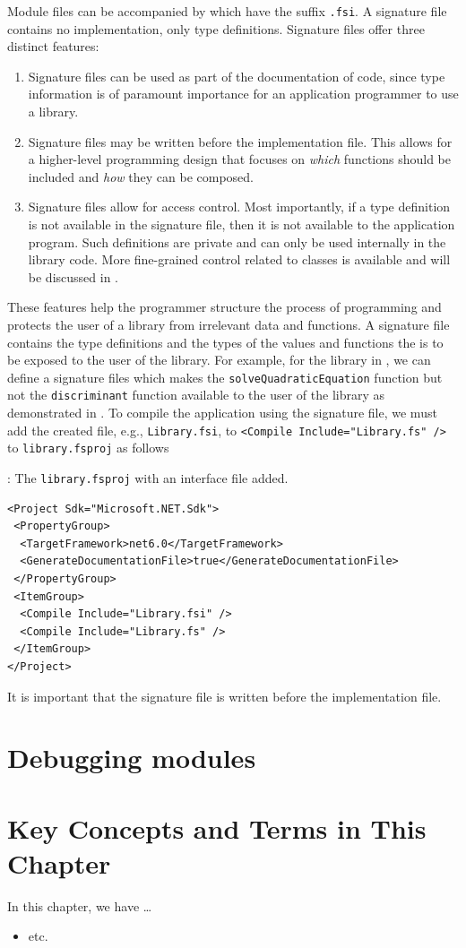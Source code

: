 \documentclass[fsharpNotes.tex]{subfiles}
\begin{document}
Module files can be accompanied by  which have the suffix \lstinline[language=console]{.fsi}. A signature file contains no implementation, only type definitions. Signature files offer three distinct features:
\begin{enumerate}
\item Signature files can be used as part of the documentation of code, since type information is of paramount importance for an application programmer to use a library. 
\item Signature files may be written before the implementation file. This allows for a higher-level programming design that focuses on \emph{which} functions should be included and \emph{how} they can be composed.
\item Signature files allow for access control. Most importantly, if a type definition is not available in the signature file, then it is not available to the application program. Such definitions are private and can only be used internally in the library code. More fine-grained control related to classes is available and will be discussed in .
\end{enumerate}
These features help the programmer structure the process of programming and protects the user of a library from irrelevant data and functions. A signature file contains the type definitions and the types of the values and functions the is to be exposed to the user of the library. For example, for the library in , we can define a signature files which makes the \lstinline{solveQuadraticEquation} function but not the \lstinline{discriminant} function available to the user of the library as demonstrated in .
To compile the application using the signature file, we must add the created file, e.g., \lstinline[language=console]{Library.fsi}, to \lstinline[language=console]{<Compile Include="Library.fs" />} to \lstinline[language=console]{library.fsproj} as follows
\begin{codeNOutput}[label=libraryFsprojFSI,
  top=-5pt,
  bottom=-5pt,
  left=-2pt,
  right=-2pt,
]{: The \texttt{library.fsproj} with an interface file added.}
  \begin{lstlisting}[language=console,escapechar=§]
<Project Sdk="Microsoft.NET.Sdk">
 <PropertyGroup>
  <TargetFramework>net6.0</TargetFramework>
  <GenerateDocumentationFile>true</GenerateDocumentationFile>
 </PropertyGroup>
 <ItemGroup>
  <Compile Include="Library.fsi" />
  <Compile Include="Library.fs" />
 </ItemGroup>
</Project>
\end{lstlisting}
\end{codeNOutput}
It is important that the signature file is written before the implementation file.


\section{Debugging modules}


\section{Key Concepts and Terms in This Chapter}
In this chapter, we have \dots
\begin{itemize}
\item etc.
\end{itemize}
\end{document}
